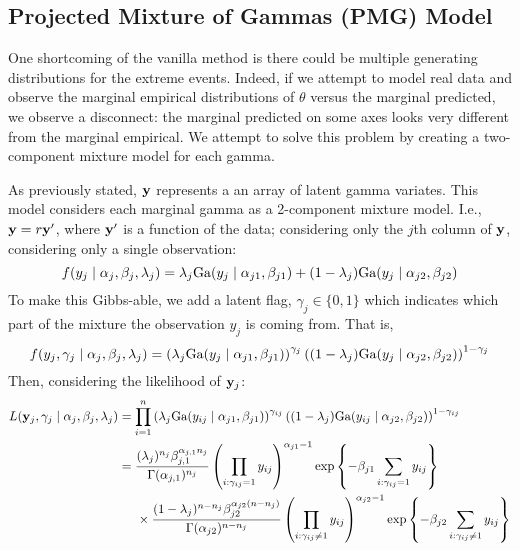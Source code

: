 \subsection{Projected Mixture of Gammas (PMG) Model}
\label{method:pmg}
One shortcoming of the vanilla method is there could be multiple
  generating distributions for the extreme events.  Indeed, if we attempt to
  model real data and observe the marginal empirical distributions of $\theta$
  versus the marginal predicted, we observe a disconnect: the marginal predicted
  on some axes looks very different from the marginal empirical.  We attempt to
  solve this problem by creating a two-component mixture model for each gamma.

As previously stated, ${\bf y}$ represents a an array of latent gamma variates.
  This model considers each marginal gamma as a 2-component mixture model.
  I.e., ${\bf y} = r{\bf y^{\prime}}$, where ${\bf y^{\prime}}$ is a function of
  the data; considering only the $j$th column of ${\bf y}$, considering only a
  single observation:
\begin{equation*}
  f(y_j\mid {\bf \alpha}_j, {\bf \beta}_j, \lambda_j) = \lambda_j\text{Ga}(y_j\mid\alpha_{j1},\beta_{j1}) + (1 - \lambda_j)\text{Ga}(y_j\mid\alpha_{j2}, \beta_{j2})
\end{equation*}
To make this Gibbs-able, we add a latent flag,
  $\gamma_j \in \lbrace 0, 1\rbrace$ which indicates which part of the mixture
  the observation $y_j$ is coming from.  That is,
\begin{equation*}
f(y_j, \gamma_j \mid{\bf \alpha}_j, {\bf \beta}_j, \lambda_j) = \left(\lambda_j\text{Ga}(y_j\mid\alpha_{j1},\beta_{j1})\right)^{\gamma_j}\left((1-\lambda_j)\text{Ga}(y_j\mid\alpha_{j2},\beta_{j2})\right)^{1-\gamma_j}
\end{equation*}
Then, considering the likelihood of ${\bf y}_j$:
\begin{equation*}
  \begin{aligned}
    L({\bf y}_j,{\bf \gamma}_j\mid{\bf\alpha}_j,{\bf \beta}_j, \lambda_j) &= \prod_{i = 1}^n\left(\lambda_j\text{Ga}(y_{ij}\mid\alpha_{j1},\beta_{j1})\right)^{\gamma_{ij}}\left((1-\lambda_j)\text{Ga}(y_{ij}\mid\alpha_{j2},\beta_{j2})\right)^{1-\gamma_{ij}}\\
    &= \frac{(\lambda_j)^{n_j}\beta_{j,1}^{\alpha_{j,1}n_{j}}}{\Gamma(\alpha_{j,1})^{n_{j}}}\left(\prod_{i:\gamma_{ij} = 1}y_{ij}\right)^{\alpha_{j1} - 1}\exp\left\lbrace-\beta_{j1}\sum_{i:\gamma_{ij} = 1}y_{ij}\right\rbrace\\
    &\hspace{0.5cm}\times\frac{(1 - \lambda_j)^{n - n_j}\beta_{j2}^{\alpha_{j2}(n - n_j)}}{\Gamma(\alpha_{j2})^{n - n_j}}\left(\prod_{i:\gamma_{ij} \neq 1}y_{ij}\right)^{\alpha_{j2} - 1}\exp\left\lbrace-\beta_{j2}\sum_{i:\gamma_{ij}\neq 1}y_{ij}\right\rbrace
  \end{aligned}
\end{equation*}
